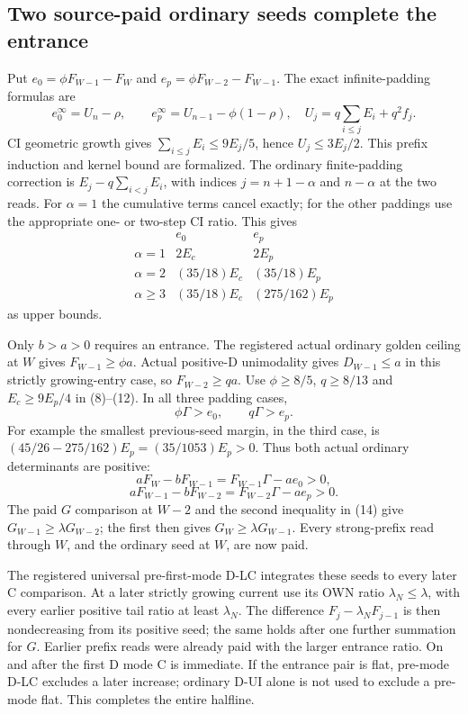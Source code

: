 \subsection*{Two source-paid ordinary seeds complete the entrance}
Put $e_0=\phi F_{W-1}-F_W$ and $e_p=\phi F_{W-2}-F_{W-1}$.
The exact infinite-padding formulas are
\[
 e_0^\infty=U_n-\rho,\qquad
 e_p^\infty=U_{n-1}-\phi(1-\rho),\quad
 U_j=q\sum_{i\le j}E_i+q^2f_j.
\]
CI geometric growth gives $\sum_{i\le j}E_i\le9E_j/5$, hence
$U_j\le3E_j/2$. This prefix induction and kernel bound are formalized.
The ordinary finite-padding correction is $E_j-q\sum_{i<j}E_i$,
with indices $j=n+1-\alpha$ and $n-\alpha$ at the two reads.
For $\alpha=1$ the cumulative terms cancel exactly; for the other
paddings use the appropriate one- or two-step CI ratio. This gives
\[
\begin{array}{c|cc}
 &e_0&e_p\\\hline
\alpha=1&2E_c&2E_p\\
\alpha=2&(35/18)E_c&(35/18)E_p\\
\alpha\ge3&(35/18)E_c&(275/162)E_p
\end{array}                                                     \tag{12}
\]
as upper bounds.

Only $b>a>0$ requires an entrance. The registered actual ordinary
golden ceiling at $W$ gives $F_{W-1}\ge\phi a$. Actual positive-D
unimodality gives $D_{W-1}\le a$ in this strictly growing-entry case,
so $F_{W-2}\ge q a$. Use $\phi\ge8/5$, $q\ge8/13$ and
$E_c\ge9E_p/4$ in (8)--(12). In all three padding cases,
\[
                         \phi\Gamma>e_0,
                           \qquad q\Gamma>e_p.       \tag{13}
\]
For example the smallest previous-seed margin, in the third case,
is $(45/26-275/162)E_p=(35/1053)E_p>0$.
Thus both actual ordinary determinants are positive:
\[
 aF_W-bF_{W-1}=F_{W-1}\Gamma-ae_0>0,
\]
\[
 aF_{W-1}-bF_{W-2}=F_{W-2}\Gamma-ae_p>0.             \tag{14}
\]
The paid $G$ comparison at $W-2$ and the second inequality in (14)
give $G_{W-1}\ge\lambda G_{W-2}$; the first then gives
$G_W\ge\lambda G_{W-1}$. Every strong-prefix read through $W$,
and the ordinary seed at $W$, are now paid.

The registered universal pre-first-mode D-LC integrates these seeds
to every later C comparison. At a later strictly growing current use
its OWN ratio $\lambda_N\le\lambda$, with every earlier positive
tail ratio at least $\lambda_N$. The difference
$F_j-\lambda_NF_{j-1}$ is then nondecreasing from its positive seed;
the same holds after one further summation for $G$. Earlier prefix
reads were already paid with the larger entrance ratio. On and after
the first D mode C is immediate. If the entrance pair is flat,
pre-mode D-LC excludes a later increase; ordinary D-UI alone is not
used to exclude a pre-mode flat. This completes the entire halfline.

